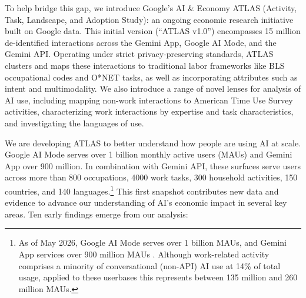 \documentclass[11pt,a4paper]{article}
\begin{document}
To help bridge this gap, we introduce Google's AI \& Economy ATLAS (Activity, Task, Landscape, and Adoption Study): an ongoing economic research initiative built on Google data. This initial version (``ATLAS v1.0'') encompasses 15 million de-identified interactions across the Gemini App, Google AI Mode, and the Gemini API. Operating under strict privacy-preserving standards, ATLAS clusters and maps these interactions to traditional labor frameworks like BLS occupational codes and O*NET tasks, as well as incorporating attributes such as intent and multimodality. We also introduce a range of novel lenses for analysis of AI use, including mapping non-work interactions to American Time Use Survey activities, characterizing work interactions by expertise and task characteristics, and investigating the languages of use. 

We are developing ATLAS to better understand how people are using AI at scale. Google AI Mode serves over 1 billion monthly active users (MAUs) and Gemini App over 900 million. In combination with Gemini API, these surfaces serve users across more than 800 occupations, 4000 work tasks, 300 household activities, 150 countries, and 140 languages.\footnote{As of May 2026, Google AI Mode serves over 1 billion MAUs, and Gemini App services over 900 million MAUs \citep{google2026a, google2026b}. Although work-related activity comprises a minority of conversational (non-API) AI use at 14\% of total usage, applied to these userbases this represents between 135 million and 260 million MAUs.} This first snapshot contributes new data and evidence to advance our understanding of AI's economic impact in several key areas. Ten early findings emerge from our analysis:
\end{document}
